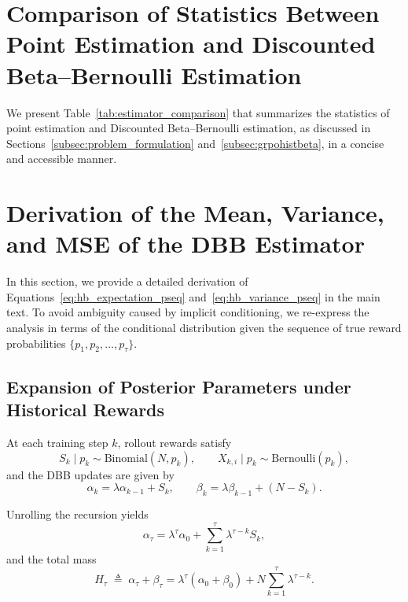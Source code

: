 \newpage
\appendix
\onecolumn

\section{Comparison of Statistics Between Point Estimation and Discounted Beta--Bernoulli Estimation}
\FloatBarrier

We present Table~\ref{tab:estimator_comparison} that summarizes the statistics of point estimation and Discounted Beta--Bernoulli estimation, as discussed in Sections~\ref{subsec:problem_formulation} and~\ref{subsec:grpohistbeta}, in a concise and accessible manner.



\FloatBarrier



\section{Derivation of the Mean, Variance, and MSE of the DBB Estimator}
\label{app:hb-derivation}

In this section, we provide a detailed derivation of Equations~\eqref{eq:hb_expectation_pseq} and~\eqref{eq:hb_variance_pseq} in the main text.
To avoid ambiguity caused by implicit conditioning, we re-express the analysis in terms of the conditional distribution given the sequence of true reward probabilities $\{p_1, p_2, \dots, p_\tau\}$.

\subsection{Expansion of Posterior Parameters under Historical Rewards}

At each training step $k$, rollout rewards satisfy
\begin{equation}
S_k \mid p_k \sim \mathrm{Binomial}(N, p_k),
\qquad
X_{k,i} \mid p_k \sim \mathrm{Bernoulli}(p_k),
\end{equation}
and the DBB updates are given by
\begin{equation}
\alpha_k = \lambda \alpha_{k-1} + S_k,
\qquad
\beta_k = \lambda \beta_{k-1} + (N - S_k).
\end{equation}

Unrolling the recursion yields
\begin{equation}
\alpha_\tau
=
\lambda^\tau \alpha_0
+
\sum_{k=1}^{\tau} \lambda^{\tau-k} S_k,
\end{equation}
and the total mass
\begin{equation}
H_\tau
\;\triangleq\;
\alpha_\tau + \beta_\tau
=
\lambda^\tau(\alpha_0 + \beta_0)
+
N \sum_{k=1}^{\tau} \lambda^{\tau-k}.
\end{equation}

